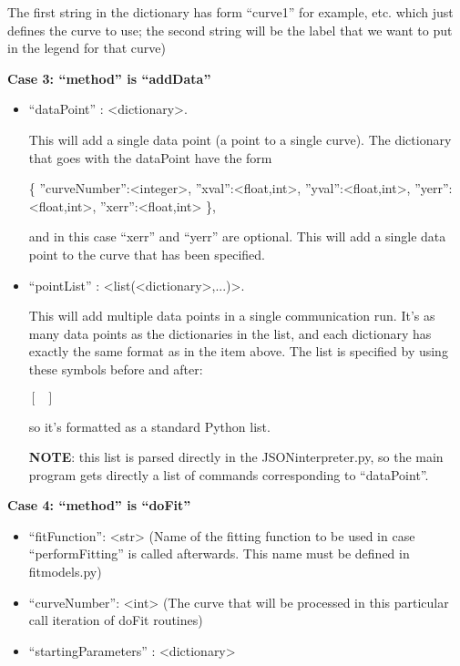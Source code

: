 \documentclass[11pt]{article} %
\begin{document}
\begin{tcolorbox}[breakable,title=Sending ``params'' to the server]
\begin{itemize}
The first string in the dictionary has form ``curve1'' for example, etc. which just defines the curve to use; 
the second string will be the label that we want to put in the legend for that curve)

\end{itemize}

\textbf{Case 3: ``method'' is ``addData''}
\begin{itemize}
\item ``dataPoint'' : <dictionary>. 

This will add a single data point (a point to a single curve).
The dictionary that goes with the dataPoint have the form

{ \{ {''}curveNumber{''}:<integer>, {''}xval{''}:<float,int>, {''}yval{''}:<float,int>, {''}yerr{''}:<float,int>, {''}xerr{''}:<float,int> \}}, 

and in this case ``xerr'' and ``yerr'' are optional. This will
add a single data point to the curve that has been specified.

\item  ``pointList'' : <list(<dictionary>,...)>. 

This will add multiple data points in a single communication run.
It's as many data points as the dictionaries in the list, and
each dictionary has exactly the same format as in the item above. 
The list is specified by using these symbols before and after:

{ $[ ~~~ ]$ }

so it's formatted as a standard Python list.

\textbf{NOTE}: this list is parsed directly in the JSONinterpreter.py, so the main program gets directly a list of commands corresponding to ``dataPoint''. 

\end{itemize}


\textbf{Case 4: ``method'' is ``doFit''}


\begin{itemize}

\item ``fitFunction'': <str> (Name of the fitting function to be used in case ``performFitting'' is called afterwards. This name must be defined in fitmodels.py)

\item ``curveNumber'': <int> (The curve that will be processed in this particular call iteration of doFit routines)

\item ``startingParameters'' : <dictionary>


\end{itemize}
\end{tcolorbox}
\end{document}
